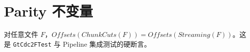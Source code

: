 \section{Parity 不变量}

\begin{invariantbox}
对任意文件 $F$，$Offsets(ChunkCuts(F)) = Offsets(Streaming(F))$。这是 \texttt{GtCdc2FTest} 与 Pipeline 集成测试的硬断言。
\end{invariantbox}
